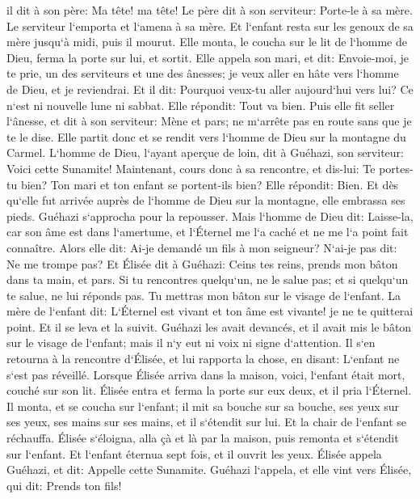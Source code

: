 \verse il dit à son père: Ma tête! ma tête! Le père dit à son serviteur: Porte-le à sa mère. 
\verse Le serviteur l`emporta et l`amena à sa mère. Et l`enfant resta sur les genoux de sa mère jusqu`à midi, puis il mourut. 
\verse Elle monta, le coucha sur le lit de l`homme de Dieu, ferma la porte sur lui, et sortit. 
\verse Elle appela son mari, et dit: Envoie-moi, je te prie, un des serviteurs et une des ânesses; je veux aller en hâte vers l`homme de Dieu, et je reviendrai. 
\verse Et il dit: Pourquoi veux-tu aller aujourd`hui vers lui? Ce n`est ni nouvelle lune ni sabbat. Elle répondit: Tout va bien. 
\verse Puis elle fit seller l`ânesse, et dit à son serviteur: Mène et pars; ne m`arrête pas en route sans que je te le dise. 
\verse Elle partit donc et se rendit vers l`homme de Dieu sur la montagne du Carmel. L`homme de Dieu, l`ayant aperçue de loin, dit à Guéhazi, son serviteur: Voici cette Sunamite! 
\verse Maintenant, cours donc à sa rencontre, et dis-lui: Te portes-tu bien? Ton mari et ton enfant se portent-ils bien? Elle répondit: Bien. 
\verse Et dès qu`elle fut arrivée auprès de l`homme de Dieu sur la montagne, elle embrassa ses pieds. Guéhazi s`approcha pour la repousser. Mais l`homme de Dieu dit: Laisse-la, car son âme est dans l`amertume, et l`Éternel me l`a caché et ne me l`a point fait connaître. 
\verse Alors elle dit: Ai-je demandé un fils à mon seigneur? N`ai-je pas dit: Ne me trompe pas? 
\verse Et Élisée dit à Guéhazi: Ceins tes reins, prends mon bâton dans ta main, et pars. Si tu rencontres quelqu`un, ne le salue pas; et si quelqu`un te salue, ne lui réponds pas. Tu mettras mon bâton sur le visage de l`enfant. 
\verse La mère de l`enfant dit: L`Éternel est vivant et ton âme est vivante! je ne te quitterai point. Et il se leva et la suivit. 
\verse Guéhazi les avait devancés, et il avait mis le bâton sur le visage de l`enfant; mais il n`y eut ni voix ni signe d`attention. Il s`en retourna à la rencontre d`Élisée, et lui rapporta la chose, en disant: L`enfant ne s`est pas réveillé. 
\verse Lorsque Élisée arriva dans la maison, voici, l`enfant était mort, couché sur son lit. 
\verse Élisée entra et ferma la porte sur eux deux, et il pria l`Éternel. 
\verse Il monta, et se coucha sur l`enfant; il mit sa bouche sur sa bouche, ses yeux sur ses yeux, ses mains sur ses mains, et il s`étendit sur lui. Et la chair de l`enfant se réchauffa. 
\verse Élisée s`éloigna, alla çà et là par la maison, puis remonta et s`étendit sur l`enfant. Et l`enfant éternua sept fois, et il ouvrit les yeux. 
\verse Élisée appela Guéhazi, et dit: Appelle cette Sunamite. Guéhazi l`appela, et elle vint vers Élisée, qui dit: Prends ton fils! 
